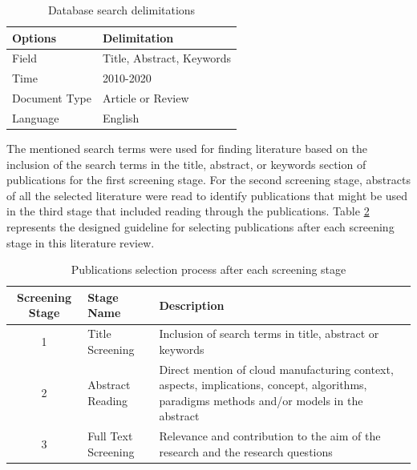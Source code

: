 \begin{table}
    \centering
    \begin{tabular}{|l|l|}
        \hline
        \textbf{Options} & \textbf{Delimitation}\\
        \hline
        Field & Title, Abstract, Keywords\\
        \hline
        Time & 2010-2020\\
        \hline
        Document Type & Article or Review\\
        \hline
        Language & English\\
        \hline 
    \end{tabular}    

    \caption{Database search delimitations}
    \label{tab:database-search}
\end{table}

The mentioned search terms were used for finding literature based on the inclusion of the search terms in the title, abstract, or keywords section of publications for the first screening stage. For the second screening stage, abstracts of all the selected literature were read to identify publications that might be used in the third stage that included reading through the publications. Table \ref{tab:pub-sel-process} represents the designed guideline for selecting publications after each screening stage in this literature review.
\begin{table}
    \centering
    \begin{tabular}{|c|l|p{4cm}|}
        \hline
        \textbf{Screening Stage} & \textbf{Stage Name} & \textbf{Description}\\
        \hline
        1 & Title Screening & Inclusion of search terms in title, abstract or keywords \\
        \hline
        2 & Abstract Reading & Direct mention of cloud manufacturing context, aspects, implications, concept, algorithms, paradigms methods and/or models in the abstract \\
        \hline
        3 & Full Text Screening & Relevance and contribution to the aim of the research and the research questions \\
        \hline
    
\end{tabular}

    \caption{Publications selection process after each screening stage}
    \label{tab:pub-sel-process}
\end{table}


